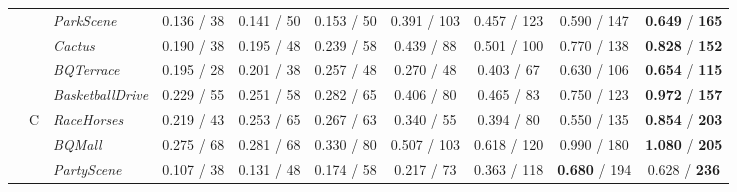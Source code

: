 \documentclass[nohyperref]{article}
\theoremstyle{plain}
\theoremstyle{definition}
\theoremstyle{remark}
\begin{document}
\begin{table*}[t]
{\begin{threeparttable}
\begin{tabular}{|c|c|l|c c| c c| c c| c c| c c|c c|c c|}
			& & \textit{ParkScene}
			& \multicolumn{2}{c|}{0.136 / 38} & \multicolumn{2}{c|}{0.141 / 50}  & \multicolumn{2}{c|}{0.153 / 50} & \multicolumn{2}{c|}{0.391 / 103} & \multicolumn{2}{c|}{0.457 / 123} & \multicolumn{2}{c|}{0.590 / 147} & \multicolumn{2}{c|}{\textbf{0.649} / \textbf{165}}\\
			
			& & \textit{Cactus}
			& \multicolumn{2}{c|}{0.190 / 38} & \multicolumn{2}{c|}{0.195 / 48}  & \multicolumn{2}{c|}{0.239 / 58} & \multicolumn{2}{c|}{0.439 / 88} & \multicolumn{2}{c|}{0.501 / 100} & \multicolumn{2}{c|}{0.770 / 138} & \multicolumn{2}{c|}{\textbf{0.828} / \textbf{152}}\\
			
			& & \textit{BQTerrace}
			& \multicolumn{2}{c|}{0.195 / 28} & \multicolumn{2}{c|}{0.201 / 38}  & \multicolumn{2}{c|}{0.257 / 48} & \multicolumn{2}{c|}{0.270 / 48} & \multicolumn{2}{c|}{0.403 / 67} & \multicolumn{2}{c|}{0.630 / 106} & \multicolumn{2}{c|}{\textbf{0.654} / \textbf{115}}\\
			
			& & \textit{BasketballDrive}
			& \multicolumn{2}{c|}{0.229 / 55} & \multicolumn{2}{c|}{0.251 / 58}  & \multicolumn{2}{c|}{0.282 / 65} & \multicolumn{2}{c|}{0.406 / 80} & \multicolumn{2}{c|}{0.465 / 83} & \multicolumn{2}{c|}{0.750 / 123} & \multicolumn{2}{c|}{\textbf{0.972} / \textbf{157}}\\
			
			\cline{2-17}
			& \multirow{4}{*}{C} & \textit{RaceHorses}
			& \multicolumn{2}{c|}{0.219 / 43} & \multicolumn{2}{c|}{0.253 / 65}  & \multicolumn{2}{c|}{0.267 / 63} & \multicolumn{2}{c|}{0.340 / 55} & \multicolumn{2}{c|}{0.394 / 80} & \multicolumn{2}{c|}{0.550 / 135} & \multicolumn{2}{c|}{\textbf{0.854} / \textbf{203}}\\
			
			& & \textit{BQMall}
			& \multicolumn{2}{c|}{0.275 / 68} & \multicolumn{2}{c|}{0.281 / 68}  & \multicolumn{2}{c|}{0.330 / 80} & \multicolumn{2}{c|}{0.507 / 103} & \multicolumn{2}{c|}{0.618 / 120} & \multicolumn{2}{c|}{0.990 / 180} & \multicolumn{2}{c|}{\textbf{1.080} / \textbf{205}}\\
			
			& & \textit{PartyScene}
			& \multicolumn{2}{c|}{0.107 / 38} & \multicolumn{2}{c|}{0.131 / 48}  & \multicolumn{2}{c|}{0.174 / 58} & \multicolumn{2}{c|}{0.217 / 73} & \multicolumn{2}{c|}{0.363 / 118} &\multicolumn{2}{c|}{\textbf{0.680} / 194} & \multicolumn{2}{c|}{0.628 / \textbf{236}}\\
			

\end{tabular}
\end{threeparttable}}
\end{table*}
\end{document}
